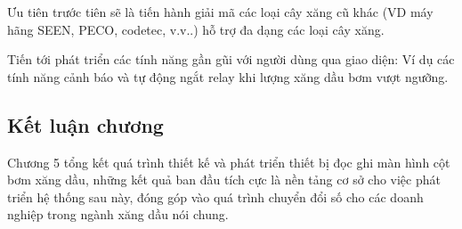 Ưu tiên trước tiên sẽ là tiến hành giải mã các loại cây xăng cũ khác (VD máy hãng SEEN, PECO, codetec, v.v..) hỗ trợ đa dạng các loại cây xăng.

Tiến tới phát triển các tính năng gần gũi với người dùng qua giao diện: Ví dụ các tính năng cảnh báo và tự động ngắt relay khi lượng xăng dầu bơm vượt ngưỡng.

\subsection{Kết luận chương}
Chương 5 tổng kết quá trình thiết kế và phát triển thiết bị đọc ghi màn hình cột bơm xăng dầu, những kết quả ban đầu tích cực là nền tảng cơ sở cho việc phát triển hệ thống sau này, đóng góp vào quá trình chuyển đổi số cho các doanh nghiệp trong ngành xăng dầu nói chung.

